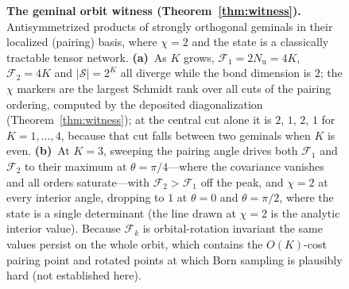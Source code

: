 \begin{figure}[tp]\centering
\caption{\textbf{The geminal orbit witness (Theorem~\ref{thm:witness}).} Antisymmetrized products of
strongly orthogonal geminals in their localized (pairing) basis, where $\chi=2$ and the state is a
classically tractable tensor network. \textbf{(a)}~As $K$ grows, $\mathcal F_1=2N_{\mathrm u}=4K$,
$\mathcal F_2=4K$ and $|\mathcal S|=2^{K}$ all diverge while the bond dimension is $2$; the $\chi$
markers are the largest Schmidt rank over all cuts of the pairing ordering, computed by the deposited
diagonalization (Theorem~\ref{thm:witness}); at the central cut alone it is $2$, $1$, $2$, $1$ for
$K=1,\dots,4$, because that cut falls between two geminals when $K$ is even.
\textbf{(b)}~At $K=3$, sweeping the pairing angle drives both $\mathcal F_1$ and $\mathcal F_2$ to their
maximum at $\theta=\pi/4$---where the covariance vanishes and all orders saturate---with
$\mathcal F_2>\mathcal F_1$ off the peak, and $\chi=2$ at every interior angle, dropping to $1$ at
$\theta=0$ and $\theta=\pi/2$, where the state is a single determinant (the line drawn at $\chi=2$ is
the analytic interior value). Because $\mathcal F_k$ is
orbital-rotation invariant the same values persist on the whole orbit, which contains the $O(K)$-cost
pairing point and rotated points at which Born sampling is plausibly hard (not established here).}\label{fig:witness}\end{figure}

